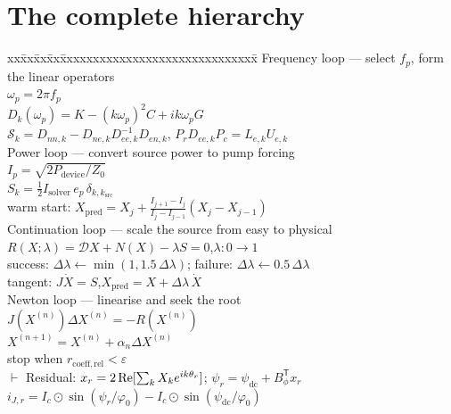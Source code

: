 \section{The complete hierarchy}
\label{sec:hierarchy}

\begin{center}
\begin{minipage}{0.95\textwidth}
\small\ttfamily
\begin{tabbing}
xx\=xx\=xx\=xx\=xxxxxxxxxxxxxxxxxxxxxxxxxxxxxx\=\kill
Frequency loop --- select $f_p$, form the linear operators \\
\> $\omega_p = 2\pi f_p$ \\
\> $D_k(\omega_p) = K - (k\omega_p)^2 C + i k\omega_p G$ \\
\> [Schur:] $\mathcal{S}_k = D_{nn,k} - D_{ne,k}D_{ee,k}^{-1}D_{en,k}$,\quad
   $P_r D_{ee,k} P_c = L_{e,k}U_{e,k}$ \\[4pt]
\> Power loop --- convert source power to pump forcing \\
\>\> $I_p = \sqrt{2P_{\mathrm{device}}/Z_0}$ \\
\>\> $S_k = \tfrac12 I_{\mathrm{solver}}\,e_p\,\delta_{k,k_{\mathrm{src}}}$ \\
\>\> warm start: $X_{\mathrm{pred}} = X_j + \frac{I_{j+1}-I_j}{I_j-I_{j-1}}(X_j-X_{j-1})$ \\[4pt]
\>\> Continuation loop --- scale the source from easy to physical \\
\>\>\> $R(X;\lambda) = \mathcal{D}X + N(X) - \lambda S = 0$,\quad $\lambda: 0\to1$ \\
\>\>\> success: $\Delta\lambda \leftarrow \min(1, 1.5\,\Delta\lambda)$;\quad
       failure: $\Delta\lambda \leftarrow 0.5\,\Delta\lambda$ \\
\>\>\> tangent: $J\dot{X} = S$,\quad $X_{\mathrm{pred}} = X + \Delta\lambda\,\dot{X}$ \\[4pt]
\>\>\> Newton loop --- linearise and seek the root \\
\>\>\>\> $J(X^{(n)})\Delta X^{(n)} = -R(X^{(n)})$ \\
\>\>\>\> $X^{(n+1)} = X^{(n)} + \alpha_n \Delta X^{(n)}$ \\
\>\>\>\> stop when $r_{\mathrm{coeff,rel}} < \varepsilon$ \\[4pt]
\>\>\>\> $\vdash$ Residual: $x_r = 2\operatorname{Re}[\sum_k X_k e^{ik\theta_r}]$;\quad
         $\psi_r = \psi_{\mathrm{dc}} + B_\phi^{\mathsf T}x_r$ \\
\>\>\>\> \phantom{$\vdash$} $i_{J,r} = I_c\odot\sin(\psi_r/\varphi_0) - I_c\odot\sin(\psi_{\mathrm{dc}}/\varphi_0)$ \\

\end{tabbing}
\end{minipage}
\end{center}

